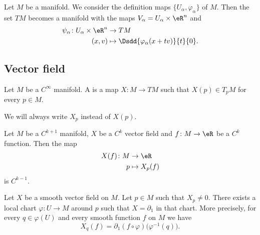 \begin{theorem}     \label{THOooTSQXooLvJMQb}
	Let \( M\) be a manifold. We consider the definition maps \( \{ U_{\alpha}, \varphi_{\alpha} \}\) of \( M\). Then the set \( TM\) becomes a manifold with the maps \( V_{\alpha}=U_{\alpha}\times \eR^n\) and
	\begin{equation}
		\begin{aligned}
			\psi_{\alpha}\colon U_{\alpha}\times \eR^n & \to TM                                         \\
			(x,v)                                      & \mapsto \Dsdd{ \varphi_{\alpha}(x+tv) }{t}{0}.
		\end{aligned}
	\end{equation}
\end{theorem}


\subsection{Vector field}

\begin{definition}        \label{DEFooAATTooLhNqDb}
	Let \( M\) be a \(  C^{\infty}\) manifold. A  is a map \( X\colon M\to TM\) such that \( X(p)\in T_pM\) for every \( p\in M\).

	We will always write \( X_p\) instead of \( X(p)\).
\end{definition}

\begin{proposition}         \label{PROPooGYWRooPIyocN}
	Let \( M\) be a \( C^{k+1}\) manifold, \( X\) be a \( C^k\) vector field and \( f\colon M \to \eR\) be a \( C^k\) function. Then the map
	\begin{equation}
		\begin{aligned}
			X(f)\colon M & \to \eR        \\
			p            & \mapsto X_p(f)
		\end{aligned}
	\end{equation}
	is \( C^{k-1}\).
\end{proposition}

\begin{lemma}       \label{LEMooLNIAooCmbLQp}
	Let \( X\) be a smooth vector field on \( M\). Let \( p\in M\) such that \( X_p\neq 0\). There exists a local chart \( \varphi\colon U\to M\) around \( p\) such that \( X=\partial_1\) in that chart. More precisely, for every \( q\in \varphi(U)\) and every smooth function \( f\) on \( M\) we have
	\begin{equation}
		X_q(f)=\partial_1(f\circ \varphi)\big( \varphi^{-1}(q) \big).
	\end{equation}
\end{lemma}


